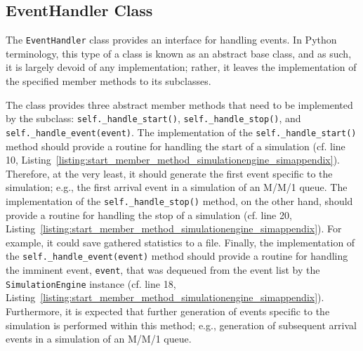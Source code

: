\subsection{EventHandler Class}
\label{sub:eventhandler_class_simappendix}
The \lstinline{EventHandler} class provides an interface for handling events. In Python terminology, this type of a class is known as an abstract base class, and as such, it is largely devoid of any implementation; rather, it leaves the implementation of the specified member methods to its subclasses.

The class provides three abstract member methods that need to be implemented by the subclass: \lstinline{self._handle_start()}, \lstinline{self._handle_stop()}, and \lstinline{self._handle_event(event)}. The implementation of the \lstinline{self._handle_start()} method should provide a routine for handling the start of a simulation (cf. line 10, Listing~\ref{listing:start_member_method_simulationengine_simappendix}). Therefore, at the very least, it should generate the first event specific to the simulation; e.g., the first arrival event in a simulation of an M/M/1 queue. The implementation of the \lstinline{self._handle_stop()} method, on the other hand, should provide a routine for handling the stop of a simulation (cf. line 20, Listing~\ref{listing:start_member_method_simulationengine_simappendix}). For example, it could save gathered statistics to a file. Finally, the implementation of the \lstinline{self._handle_event(event)} method should provide a routine for handling the imminent event, \lstinline{event}, that was dequeued from the event list by the \lstinline{SimulationEngine} instance (cf. line 18, Listing~\ref{listing:start_member_method_simulationengine_simappendix}). Furthermore, it is expected that further generation of events specific to the simulation is performed within this method; e.g., generation of subsequent arrival events in a simulation of an M/M/1 queue.

